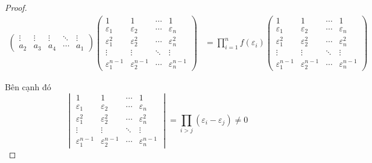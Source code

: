 \begin{proof}
\begin{align*}
\begin{pmatrix}
            \vdots  & \vdots & \vdots & \ddots & \vdots  \\
            a_{2}   & a_{3}  & a_{4}  & \cdots & a_{1}
        \end{pmatrix}
        \begin{pmatrix}
            1                     & 1                     & \cdots & 1                     \\
            \varepsilon_{1}       & \varepsilon_{2}       & \cdots & \varepsilon_{n}       \\
            \varepsilon_{1}^{2}   & \varepsilon_{2}^{2}   & \cdots & \varepsilon_{n}^{2}   \\
            \vdots                & \vdots                & \ddots & \vdots                \\
            \varepsilon_{1}^{n-1} & \varepsilon_{2}^{n-1} & \cdots & \varepsilon_{n}^{n-1}
        \end{pmatrix}
         & = \prod^{n}_{i=1}f(\varepsilon_{i})
        \begin{pmatrix}
            1                     & 1                     & \cdots & 1                     \\
            \varepsilon_{1}       & \varepsilon_{2}       & \cdots & \varepsilon_{n}       \\
            \varepsilon_{1}^{2}   & \varepsilon_{2}^{2}   & \cdots & \varepsilon_{n}^{2}   \\
            \vdots                & \vdots                & \ddots & \vdots                \\
            \varepsilon_{1}^{n-1} & \varepsilon_{2}^{n-1} & \cdots & \varepsilon_{n}^{n-1}
        \end{pmatrix}
    \end{align*}
    \endgroup{}

    Bên cạnh đó
    \[
        \begin{vmatrix}
            1                     & 1                     & \cdots & 1                     \\
            \varepsilon_{1}       & \varepsilon_{2}       & \cdots & \varepsilon_{n}       \\
            \varepsilon_{1}^{2}   & \varepsilon_{2}^{2}   & \cdots & \varepsilon_{n}^{2}   \\
            \vdots                & \vdots                & \ddots & \vdots                \\
            \varepsilon_{1}^{n-1} & \varepsilon_{2}^{n-1} & \cdots & \varepsilon_{n}^{n-1}
        \end{vmatrix}
        = \prod_{i>j}(\varepsilon_{i} - \varepsilon_{j}) \ne 0
    \]
    

\end{proof}
